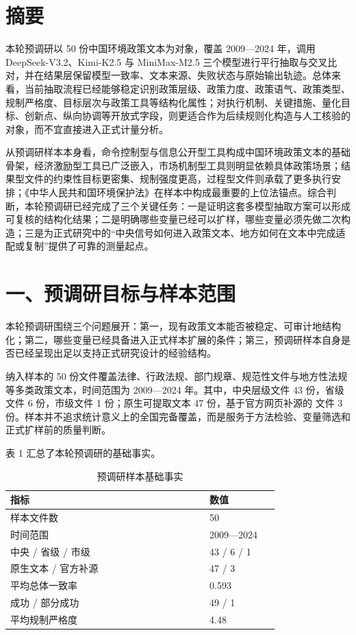 \section*{摘要}

本轮预调研以 50 份中国环境政策文本为对象，覆盖 2009---2024 年，调用
DeepSeek-V3.2、Kimi-K2.5 与 MiniMax-M2.5
三个模型进行平行抽取与交叉比对，并在结果层保留模型一致率、文本来源、失败状态与原始输出轨迹。总体来看，当前抽取流程已经能够稳定识别政策层级、政策力度、政策语气、政策类型、规制严格度、目标层次与政策工具等结构化属性；对执行机制、关键措施、量化目标、创新点、纵向协调等开放式字段，则更适合作为后续规则化构造与人工核验的对象，而不宜直接进入正式计量分析。

从预调研样本本身看，命令控制型与信息公开型工具构成中国环境政策文本的基础骨架，经济激励型工具已广泛嵌入，市场机制型工具则明显依赖具体政策场景；结果型文件的约束性目标更密集、规制强度更高，过程型文件则承载了更多执行安排；《中华人民共和国环境保护法》在样本中构成最重要的上位法锚点。综合判断，本轮预调研已经完成了三个关键任务：一是证明这套多模型抽取方案可以形成可复核的结构化结果；二是明确哪些变量已经可以扩样，哪些变量必须先做二次构造；三是为正式研究中的``中央信号如何进入政策文本、地方如何在文本中完成适配或复制''提供了可靠的测量起点。

\section{一、预调研目标与样本范围}

本轮预调研围绕三个问题展开：第一，现有政策文本能否被稳定、可审计地结构化；第二，哪些变量已经具备进入正式样本扩展的条件；第三，预调研样本自身是否已经呈现出足以支持正式研究设计的经验结构。

纳入样本的 50
份文件覆盖法律、行政法规、部门规章、规范性文件与地方性法规等多类政策文本，时间范围为
2009---2024 年。其中，中央层级文件 43 份，省级文件 6 份，市级文件 1
份；原生可提取文本 47 份，基于官方网页补源的
 文件 3
份。样本并不追求统计意义上的全国完备覆盖，而是服务于方法检验、变量筛选和正式扩样前的质量判断。

表 1 汇总了本轮预调研的基础事实。

\begin{table}[H]
\centering
\caption{预调研样本基础事实}
\label{tab:basic_facts}
\begin{tabular}{L{0.58\linewidth}C{0.20\linewidth}}
\toprule
指标 & 数值 \\
\midrule
样本文件数 & 50 \\
时间范围 & 2009---2024 \\
中央 / 省级 / 市级 & 43 / 6 / 1 \\
原生文本 / 官方补源 & 47 / 3 \\
平均总体一致率 & 0.593 \\
成功 / 部分成功 & 49 / 1 \\
平均规制严格度 & 4.48 \\
\bottomrule
\end{tabular}
\end{table}

